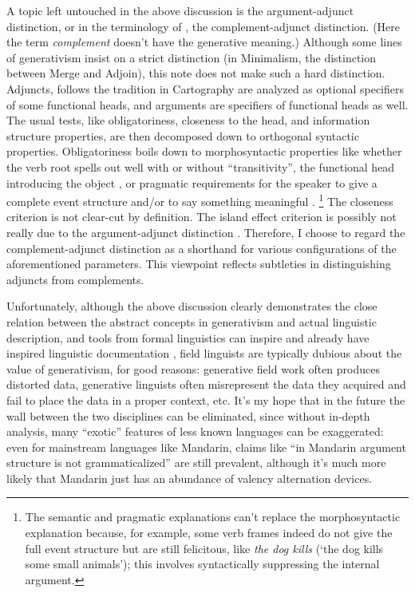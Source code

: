 \documentclass[UTF8, a4paper, oneside, scheme=plain, 12pt]{ctexbook}
\newcommand*{\citechap}[1]{Ch.~{#1}}
\newcommand*{\term}[1]{\emph{#1}}
\newcommand{\form}[1]{\emph{#1}}
\newcommand{\translate}[1]{`#1'}
\begin{document}
{A topic left untouched in the above discussion 
is the argument-adjunct distinction, 
or in the terminology of \citet{cgel}, 
the complement-adjunct distinction.
(Here the term \term{complement} doesn't have the generative meaning.)
Although some lines of generativism insist on a strict distinction
(in Minimalism, the distinction between Merge and Adjoin), 
this note does not make such a hard distinction. 
Adjuncts, follows the tradition in Cartography 
are analyzed as optional specifiers of some functional heads, 
and arguments are specifiers of functional heads as well.
The usual tests, like obligatoriness, closeness to the head, 
and information structure properties, are then decomposed down to 
orthogonal syntactic properties.
Obligatoriness boils down to morphosyntactic properties 
like whether the verb root spells out well with or without ``transitivity'',
the functional head introducing the object \citep[\citechap{10}]{siddiqi2009syntax},
or pragmatic requirements for the speaker to 
give a complete event structure \citep{grimshaw1993obligatory}
and/or to say something meaningful \citep{goldberg2001pragmatics}.
\footnote{
    The semantic and pragmatic explanations can't replace 
    the morphosyntactic explanation because, for example,
    some verb frames indeed do not give the full event structure 
    but are still felicitous, like \form{the dog kills} 
    (\translate{the dog kills some small animals});
    this involves syntactically suppressing the internal argument.
}
The closeness criterion is not clear-cut by definition.
The island effect criterion is possibly not really due to the argument-adjunct distinction
\citep{mcinnerney2023argument}.
Therefore, I choose to regard the complement-adjunct distinction as a shorthand 
for various configurations of the aforementioned parameters. 
This viewpoint reflects subtleties in distinguishing adjuncts from complements.

Unfortunately, although the above discussion clearly demonstrates 
the close relation between the abstract concepts in generativism 
and actual linguistic description, 
and tools from formal linguistics can inspire and already have inspired 
linguistic documentation \citep{rice2006let},
field linguists are typically dubious about  
the value of generativism,
for good reasons: 
generative field work often produces distorted data, 
generative linguists often misrepresent the data they acquired 
and fail to place the data in a proper context, etc.
It's my hope that in the future the wall 
between the two disciplines can be eliminated,
since without in-depth analysis, 
many ``exotic'' features of less known languages can be exaggerated:
even for mainstream languages like Mandarin, 
claims like ``in Mandarin argument structure is not grammaticalized'' are still prevalent, 
although it's much more likely that Mandarin just has an abundance of valency alternation devices.

}
\end{document}
